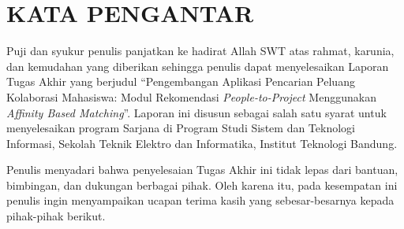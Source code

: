 \chapter*{KATA PENGANTAR}

Puji dan syukur penulis panjatkan ke hadirat Allah SWT atas rahmat, karunia, dan kemudahan yang diberikan sehingga penulis dapat menyelesaikan Laporan Tugas Akhir yang berjudul ``Pengembangan Aplikasi Pencarian Peluang Kolaborasi Mahasiswa: Modul Rekomendasi \emph{People-to-Project} Menggunakan \emph{Affinity Based Matching}''. Laporan ini disusun sebagai salah satu syarat untuk menyelesaikan program Sarjana di Program Studi Sistem dan Teknologi Informasi, Sekolah Teknik Elektro dan Informatika, Institut Teknologi Bandung.

Penulis menyadari bahwa penyelesaian Tugas Akhir ini tidak lepas dari bantuan, bimbingan, dan dukungan berbagai pihak. Oleh karena itu, pada kesempatan ini penulis ingin menyampaikan ucapan terima kasih yang sebesar-besarnya kepada pihak-pihak berikut.

